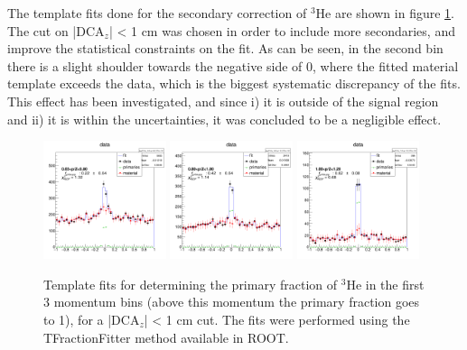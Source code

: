 The template fits done for the secondary correction of $^3\mathrm{He}$ are shown in figure \ref{fig:Template_fits_he}. The cut on |DCA$_z$| < 1 cm was chosen in order to include more secondaries, and improve the statistical constraints on the fit. As can be seen, in the second bin there is a slight shoulder towards the negative side of 0, where the fitted material template exceeds the data, which is the biggest systematic discrepancy of the fits. This effect has been investigated, and since i) it is outside of the signal region and ii) it is within the uncertainties, it was concluded to be a negligible effect. 

\begin{figure}
    \centering
    \includegraphics[width=0.32\textwidth]{figures/he3_template_fits/TemplateFitHe3_0.65<p<0.8_rebin_5.png}
    \includegraphics[width=0.32\textwidth]{figures/he3_template_fits/TemplateFitHe3_0.8<p<1.0_rebin_5.png}
    \includegraphics[width=0.32\textwidth]{figures/he3_template_fits/TemplateFitHe3_1.0<p<1.2_rebin_5.png}
    \caption{Template fits for determining the primary fraction of $^3\mathrm{He}$ in the first 3 momentum bins (above this momentum the primary fraction goes to 1), for a |DCA$_z$| < 1 cm cut. The fits were performed using the TFractionFitter method available in ROOT.}
    \label{fig:Template_fits_he}
\end{figure}

